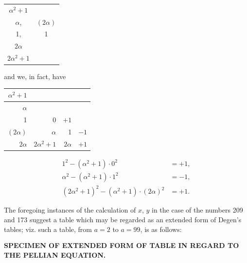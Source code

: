 \documentclass[12pt,a4paper]{article}
\begin{document}
\begin{center}
\begin{tabular}{cc}
$\alpha^{2}+1$ & \\
$\alpha$, & $(2\alpha)$ \\
1, & 1 \\
$2\alpha$ & \\
$2\alpha^{2}+1$ &
\end{tabular}
\end{center}

and we, in fact, have

\begin{center}
\begin{tabular}{r|r|r|r}
$\alpha^{2}+1$ & & & \\ \hline
$\alpha$ & & & \\
1 & 0 & $+1$ & \\
$(2\alpha)$ & $\alpha$ & 1 & $-1$ \\
$2\alpha$ & $2\alpha^{2}+1$ & $2\alpha$ & $+1$
\end{tabular}
\end{center}
\[
\begin{aligned}
1^{2} - (\alpha^{2}+1) \cdot 0^{2} &= +1, \\
\alpha^{2} - (\alpha^{2}+1) \cdot 1^{2} &= -1, \\
(2\alpha^{2}+1)^{2} - (\alpha^{2}+1) \cdot (2\alpha)^{2} &= +1.
\end{aligned}
\]

\newpage
The foregoing instances of the calculation of $x$, $y$ in the case of the numbers 209 and 173 suggest a table which may be regarded as an extended form of Degen's tables; viz. such a table, from $a = 2$ to $a = 99$, is as follows:

\begin{center}
\textbf{SPECIMEN OF EXTENDED FORM OF TABLE IN REGARD TO THE PELLIAN EQUATION.}
\end{center}
\end{document}
